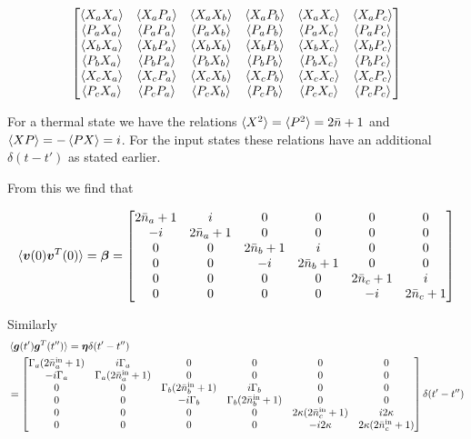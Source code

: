 \documentclass[12pt]{article}
\newcommand{\bv}[1]{\boldsymbol{#1}}
\begin{document}
\begin{equation}
\begin{bmatrix}
\braket{X_a X_a} & \braket{X_a P_a} & \braket{X_a X_b} & \braket{X_a P_b} & \braket{X_a X_c} & \braket{X_a P_c}\\
\braket{P_a X_a} & \braket{P_a P_a} & \braket{P_a X_b} & \braket{P_a P_b} & \braket{P_a X_c} & \braket{P_a P_c}\\
\braket{X_b X_a} & \braket{X_b P_a} & \braket{X_b X_b} & \braket{X_b P_b} & \braket{X_b X_c} & \braket{X_b P_c}\\
\braket{P_b X_a} & \braket{P_b P_a} & \braket{P_b X_b} & \braket{P_b P_b} & \braket{P_b X_c} & \braket{P_b P_c}\\
\braket{X_c X_a} & \braket{X_c P_a} & \braket{X_c X_b} & \braket{X_c P_b} & \braket{X_c X_c} & \braket{X_c P_c}\\
\braket{P_c X_a} & \braket{P_c P_a} & \braket{P_c X_b} & \braket{P_c P_b} & \braket{P_c X_c} & \braket{P_c P_c}\\
\end{bmatrix}
\end{equation}

For a thermal state we have the relations $\braket{X^2} = \braket{P^2} = 2\bar{n}+1$ and $\braket{XP} = -\braket{PX} = i$. For the input states these relations have an additional $\delta(t-t')$ as stated earlier.

From this we find that 

\begin{equation}
\braket{\bv{v}(0)\bv{v}^T(0)}=\bv{\beta} = 
\begin{bmatrix}
2\bar{n}_a+1 & i & 0 & 0 & 0 & 0\\
-i & 2\bar{n}_a+1 & 0 & 0 & 0 & 0\\
0 & 0 & 2\bar{n}_b+1 & i & 0 & 0\\
0 & 0 & -i & 2\bar{n}_b+1 & 0 & 0\\
0 & 0 & 0 & 0 & 2\bar{n}_c+1 & i\\
0 & 0 & 0 & 0 & -i & 2\bar{n}_c+1\\
\end{bmatrix}
\end{equation}

Similarly
\begin{align}
&\braket{\bv{g}(t')\bv{g}^T(t'')}=\bv{\eta}\delta(t'-t'')\\
&=
\begin{bmatrix}
\Gamma_a (2\bar{n}^{\text{in}}_a+1) & i\Gamma_a & 0 & 0 & 0 & 0\\
-i\Gamma_a & \Gamma_a(2\bar{n}^{\text{in}}_a+1) & 0 & 0 & 0 & 0\\
0 & 0 & \Gamma_b(2\bar{n}^{\text{in}}_b+1) & i\Gamma_b & 0 & 0\\
0 & 0 & -i\Gamma_b & \Gamma_b(2\bar{n}^{\text{in}}_b+1) & 0 & 0\\
0 & 0 & 0 & 0 & 2\kappa(2\bar{n}^{\text{in}}_c+1) & i2\kappa\\
0 & 0 & 0 & 0 & -i2\kappa & 2\kappa(2\bar{n}^{\text{in}}_c+1)\\
\end{bmatrix}
\delta(t'-t'')
\end{align}
\end{document}
